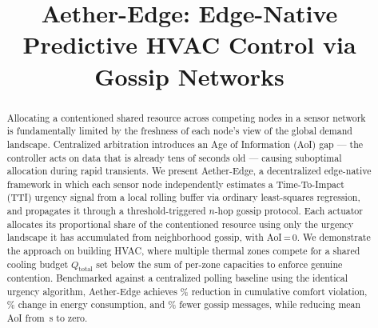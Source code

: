 \documentclass[conference]{IEEEtran}
\begin{document}
\title{Aether-Edge: Edge-Native Predictive HVAC Control via Gossip Networks}

\author{%
  \and
  \and
}

\maketitle
\thispagestyle{plain}
\pagestyle{plain}
\begin{abstract}
Allocating a contentioned shared resource across competing nodes in a sensor
network is fundamentally limited by the freshness of each node's view of the
global demand landscape.  Centralized arbitration introduces an Age of
Information (AoI) gap — the controller acts on data that is already tens of
seconds old — causing suboptimal allocation during rapid transients.  We
present Aether-Edge, a decentralized edge-native framework in which each
sensor node independently estimates a Time-To-Impact (TTI) urgency signal
from a local rolling buffer via ordinary least-squares regression, and
propagates it through a threshold-triggered $n$-hop gossip protocol.  Each
actuator allocates its proportional share of the contentioned resource using
only the urgency landscape it has accumulated from neighborhood gossip, with
AoI\,=\,0.  We demonstrate the approach on building HVAC, where multiple
thermal zones compete for a shared cooling budget $Q_{\text{total}}$ set
below the sum of per-zone capacities to enforce genuine contention.
Benchmarked against a centralized polling baseline using the identical
urgency algorithm, Aether-Edge achieves \% reduction in cumulative
comfort violation, \% change in energy consumption, and \%
fewer gossip messages, while reducing mean AoI from \,s to zero.
\end{abstract}

\end{document}
